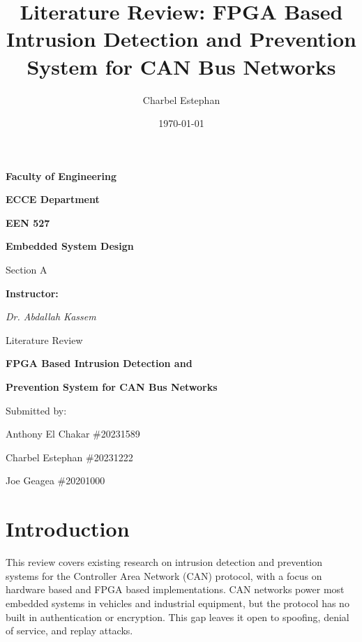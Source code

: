 \documentclass[11pt]{article}
\title{Literature Review: FPGA Based Intrusion Detection and Prevention System for CAN Bus Networks}
\author{Charbel Estephan}
\date{\today}
\begin{document}
\begin{titlepage}
\centering
\vspace*{1.5cm}
{\Large \bfseries Faculty of Engineering\par}
{\Large \bfseries ECCE Department\par}

\vspace{2.2cm}
{\Large \bfseries EEN 527\par}
{\Large \bfseries Embedded System Design\par}
{\large Section A\par}

\vspace{2.5cm}
{\large \bfseries Instructor:\par}
\vspace{0.3cm}
{\large \textit{Dr. Abdallah Kassem}\par}

\vspace{2.5cm}
{\normalsize Literature Review\par}
\vspace{0.4cm}
{\large \bfseries FPGA Based Intrusion Detection and\par}
{\large \bfseries Prevention System for CAN Bus Networks\par}

\vspace{2cm}
{\normalsize Submitted by:\par}
\vspace{0.3cm}
{\large Anthony El Chakar \#20231589\par}
{\large Charbel Estephan \#20231222\par}
{\large Joe Geagea \#20201000\par}

\vfill
\end{titlepage}

\twocolumn

\section{Introduction}

This review covers existing research on intrusion detection and prevention systems for the Controller Area Network (CAN) protocol, with a focus on hardware based and FPGA based implementations. CAN networks power most embedded systems in vehicles and industrial equipment, but the protocol has no built in authentication or encryption. This gap leaves it open to spoofing, denial of service, and replay attacks.
\end{document}
